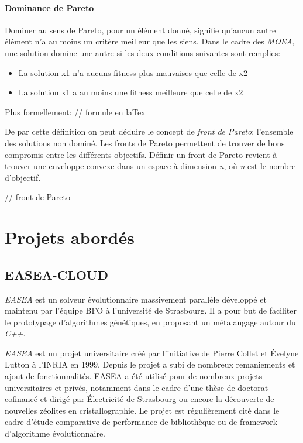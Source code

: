 \documentclass[french, 11pt]{memoir}
\begin{document}
\paragraph{Dominance de Pareto}\label{dominance-de-pareto}

Dominer au sens de Pareto, pour un élément donné, signifie qu'aucun
autre élément n'a au moins un critère meilleur que les siens. Dans le
cadre des \emph{MOEA}, une solution domine une autre si les deux
conditions suivantes sont remplies:

\begin{itemize}
	\item
	La solution x1 n'a aucuns fitness plus mauvaises que celle de x2
	\item
	La solution x1 a au moins une fitness meilleure que celle de x2
\end{itemize}

\bigskip
Plus formellement: // formule en laTex

\bigskip
De par cette définition on peut déduire le concept de \emph{front de
	Pareto}: l'ensemble des solutions non dominé. Les fronts de Pareto
permettent de trouver de bons compromis entre les différents objectifs.
Définir un front de Pareto revient à trouver une enveloppe convexe dans
un espace à dimension \textit{n}, où \textit{n} est le nombre d'objectif.

// front de Pareto

\section{Projets abordés}\label{projets-aborduxe9s}

\subsection{EASEA-CLOUD}\label{easea-cloud}

\emph{EASEA} est un solveur évolutionnaire massivement parallèle
développé et maintenu par l'équipe BFO à l'université de Strasbourg. Il
a pour but de faciliter le prototypage d'algorithmes génétiques, en
proposant un métalangage autour du \emph{C++}.

\bigskip
\emph{EASEA} est un projet
universitaire créé par l'initiative de Pierre Collet et Évelyne Lutton à
l'INRIA en 1999. Depuis le projet a subi de nombreux remaniements et
ajout de fonctionnalités. EASEA a été utilisé pour de nombreux projets
universitaires et privés, notamment dans le cadre d'une thèse de
doctorat cofinancé et dirigé par Électricité de Strasbourg ou encore la
découverte de nouvelles zéolites en cristallographie. Le projet est
régulièrement cité dans le cadre d'étude comparative de performance de
bibliothèque ou de framework d'algorithme évolutionnaire.
\end{document}
